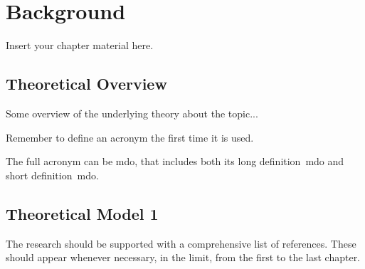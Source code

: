 
\chapter{Background}
\label{chapter:background}

Insert your chapter material here.


\section{Theoretical Overview}
\label{section:theory}

Some overview of the underlying theory about the topic...

Remember to define an acronym the first time it is used.

The full acronym can be \acrfull{mdo}, that includes both its long definition~\acrlong{mdo} and short definition~\acrshort{mdo}.


\section{Theoretical Model 1}
\label{section:theory1}

The research should be supported with a comprehensive list of references.
These should appear whenever necessary, in the limit, from the first to the last chapter.

